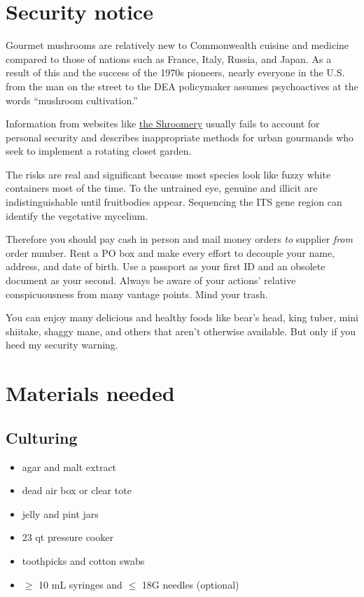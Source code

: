 \documentclass{article}
\begin{document}
\section*{Security notice}

Gourmet mushrooms are relatively new to Commonwealth cuisine and medicine compared to those of nations such as France, Italy, Russia, and Japan.
As a result of this and the success of the 1970s pioneers, nearly everyone in the U.S. from the man on the street to the DEA policymaker assumes psychoactives at the words ``mushroom cultivation.''

Information from websites like \href{https://www.shroomery.org/forums/}{the Shroomery} usually fails to account for personal security and describes inappropriate methods for urban gourmands who seek to implement a rotating closet garden.

The risks are real and significant because most species look like fuzzy white containers most of the time.
To the untrained eye, genuine and illicit are indistinguishable until fruitbodies appear.
Sequencing the ITS gene region can identify the vegetative mycelium.

Therefore you should pay cash in person and mail money orders \emph{to} supplier \emph{from} order number.
Rent a PO box and make every effort to decouple your name, address, and date of birth.
Use a passport as your first ID and an obsolete document as your second.
Always be aware of your actions' relative conspicuousness from many vantage points.
Mind your trash.

You can enjoy many delicious and healthy foods like bear's head, king tuber, mini shiitake, shaggy mane, and others that aren't otherwise available.
But only if you heed my security warning.


\section*{Materials needed}


\subsection*{Culturing}

\begin{itemize}
	\item agar and malt extract
	\item dead air box or clear tote
	\item jelly and pint jars
	\item 23 qt pressure cooker
	\item toothpicks and cotton swabs
	\item $\geq$ 10 mL syringes and $\leq$ 18G needles  (optional)
\end{itemize}
\end{document}
